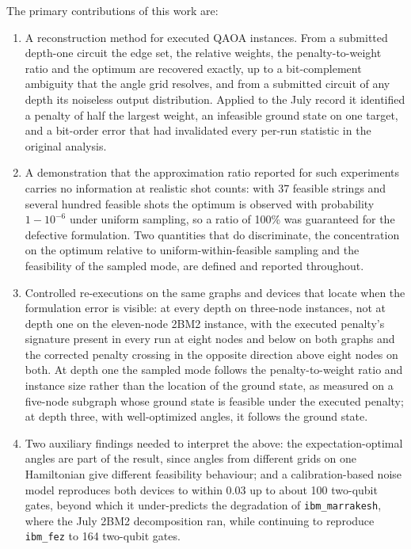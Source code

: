 \documentclass{iopjournal}
\begin{document}
The primary contributions of this work are:
\begin{enumerate}
\item A reconstruction method for executed QAOA instances. From a submitted depth-one circuit the edge set, the relative weights, the penalty-to-weight ratio and the optimum are recovered exactly, up to a bit-complement ambiguity that the angle grid resolves, and from a submitted circuit of any depth its noiseless output distribution. Applied to the July record it identified a penalty of half the largest weight, an infeasible ground state on one target, and a bit-order error that had invalidated every per-run statistic in the original analysis.
\item A demonstration that the approximation ratio reported for such experiments carries no information at realistic shot counts: with 37 feasible strings and several hundred feasible shots the optimum is observed with probability $1 - 10^{-6}$ under uniform sampling, so a ratio of 100\% was guaranteed for the defective formulation. Two quantities that do discriminate, the concentration on the optimum relative to uniform-within-feasible sampling and the feasibility of the sampled mode, are defined and reported throughout.
\item Controlled re-executions on the same graphs and devices that locate when the formulation error is visible: at every depth on three-node instances, not at depth one on the eleven-node 2BM2 instance, with the executed penalty's signature present in every run at eight nodes and below on both graphs and the corrected penalty crossing in the opposite direction above eight nodes on both. At depth one the sampled mode follows the penalty-to-weight ratio and instance size rather than the location of the ground state, as measured on a five-node subgraph whose ground state is feasible under the executed penalty; at depth three, with well-optimized angles, it follows the ground state.
\item Two auxiliary findings needed to interpret the above: the expectation-optimal angles are part of the result, since angles from different grids on one Hamiltonian give different feasibility behaviour; and a calibration-based noise model reproduces both devices to within 0.03 up to about 100 two-qubit gates, beyond which it under-predicts the degradation of \texttt{ibm\_marrakesh}, where the July 2BM2 decomposition ran, while continuing to reproduce \texttt{ibm\_fez} to 164 two-qubit gates.
\end{enumerate}
\end{document}
